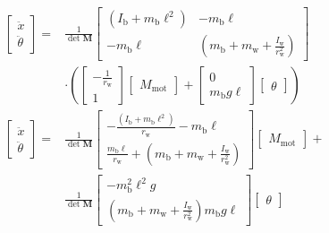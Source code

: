 \documentclass[journal]{IEEEtran}
\begin{document}
\begin{align}
    \begin{bmatrix}
        \ddot{x} \\ \ddot{\theta}
    \end{bmatrix}
    =
& \frac{1}{\det{\mathbf{M}}}
\begin{bmatrix}
    (I_{\mathrm{b}}+m_{\mathrm{b}}\ell^2) & -m_{\mathrm{b}}\ell \\
    -m_{\mathrm{b}}\ell & (m_{\mathrm{b}}+m_{\mathrm{w}}+\frac{I_{\mathrm{w}}}{r_{\mathrm{w}}^2})
\end{bmatrix}
\\ &
\cdot
\left(
    \begin{bmatrix}
        -\frac{1}{r_{\mathrm{w}}} \\ 1
    \end{bmatrix}
    \begin{bmatrix}
        M_{\mathrm{mot}}
    \end{bmatrix}
    +
    \begin{bmatrix}
        0 \\ m_{\mathrm{b}}g\ell
    \end{bmatrix}
    \begin{bmatrix}
        \theta 
    \end{bmatrix}
\right) \\
\begin{bmatrix}
        \ddot{x} \\ \ddot{\theta}
    \end{bmatrix}
    =
    &\frac{1}{\det{\mathbf{M}}}
    \begin{bmatrix}
        -\frac{(I_{\mathrm{b}}+m_{\mathrm{b}}\ell^2)}{r_{\mathrm{w}}} - m_{\mathrm{b}}\ell \\
        \frac{m_{\mathrm{b}}\ell}{r_{\mathrm{w}}} + (m_{\mathrm{b}}+m_{\mathrm{w}}+\frac{I_{\mathrm{w}}}{r_{\mathrm{w}}^2})
    \end{bmatrix}
    \begin{bmatrix}
        M_{\mathrm{mot}}
    \end{bmatrix}
    + \\ &
    \frac{1}{\det{\mathbf{M}}}
    \begin{bmatrix}
        -m_{\mathrm{b}}^{2}\ell^{2}g \\
        (m_{\mathrm{b}}+m_{\mathrm{w}}+\frac{I_{\mathrm{w}}}{r_{\mathrm{w}}^2})m_{\mathrm{b}}g\ell
    \end{bmatrix}
    \begin{bmatrix}
        \theta
    \end{bmatrix}
\end{align}
\end{document}
